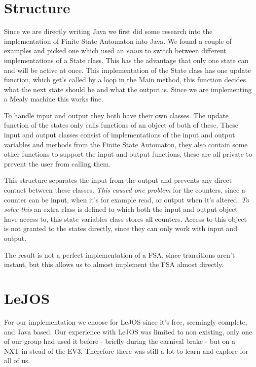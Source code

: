 \section{Structure}
Since we are directly writing Java we first did some research into the implementation of Finite State Automaton into Java. We found a couple of examples and picked one which used an \emph{enum} to switch between different implementations of a State class. This has the advantage that only one state can and will be active at once. This implementation of the State class has one update function, which get's called by a loop in the Main method, this function decides what the next state should be and what the output is. Since we are implementing a Mealy machine this works fine.

To handle input and output they both have their own classes. The update function of the states only calls functions of an object of both of these. These input and output classes consist of implementations of the input and output variables and methods from the Finite State Automaton, they also contain some other functions to support the input and output functions, these are all private to prevent the user from calling them.

This structure separates the input from the output and prevents any direct contact between these classes. \emph{This caused one problem} for the counters, since a counter can be input, when it's for example read, or output when it's altered. \emph{To solve this} an extra class is defined to which both the input and output object have access to, this state variables class stores all counters. Access to this object is not granted to the states directly, since they can only work with input and output.

The result is not a perfect implementation of a FSA, since transitions aren't instant, but this allows us to almost implement the FSA almost directly.


\section{LeJOS} \label{implementation:lejos}
For our implementation we choose for LeJOS since it's free, seemingly complete, and Java based. Our experience with LeJOS was limited to non existing, only one of our group had used it before - briefly during the carnival brake - but on a NXT in stead of the EV3. Therefore there was still a lot to learn and explore for all of us.

